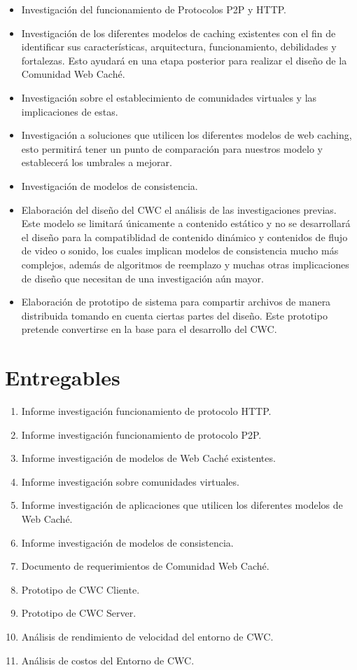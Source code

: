 \begin{itemize}
\item Investigación del funcionamiento de Protocolos P2P y HTTP.
\item Investigación de los diferentes modelos de caching existentes con el fin de identificar sus características, arquitectura, funcionamiento, debilidades y fortalezas. Esto ayudará en una etapa posterior para realizar el diseño de la Comunidad Web Caché.
\item Investigación sobre el establecimiento de comunidades virtuales y las implicaciones de estas.
\item Investigación  a soluciones que utilicen los diferentes modelos de web caching, esto permitirá tener un punto de comparación para nuestros modelo y establecerá los umbrales a mejorar.
\item Investigación de modelos de consistencia.
\item Elaboración del diseño del CWC el análisis de las investigaciones previas. Este modelo se limitará únicamente a contenido estático y no se desarrollará el diseño para la compatiblidad de contenido dinámico y contenidos de flujo de video o sonido, los cuales implican modelos de consistencia mucho más complejos, además de algoritmos de reemplazo y muchas otras implicaciones de diseño que necesitan de una investigación aún mayor.
\item Elaboración de prototipo de sistema para compartir archivos de manera distribuida tomando en cuenta ciertas partes del diseño. Este prototipo pretende convertirse en la base para el desarrollo del CWC.
\end{itemize}

\section{Entregables}
\begin{enumerate}
\item Informe investigación funcionamiento de protocolo HTTP.
\item Informe investigación funcionamiento de protocolo P2P.
\item Informe investigación de modelos de Web Caché existentes.
\item Informe investigación sobre comunidades virtuales.
\item Informe investigación de aplicaciones que utilicen los diferentes modelos de Web Caché.
\item Informe investigación de modelos de consistencia.
\item Documento de requerimientos de Comunidad Web Caché.
\item Prototipo de CWC Cliente.
\item Prototipo de CWC Server.
\item Análisis de rendimiento de velocidad del entorno de CWC.
\item Análisis de costos del Entorno de CWC.
\end{enumerate}  

